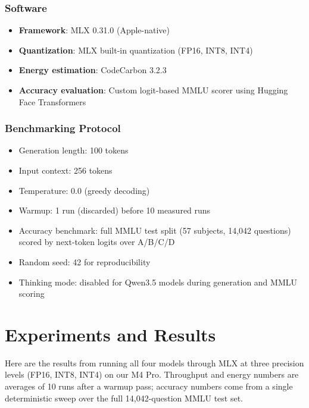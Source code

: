 \documentclass[journal]{IEEEtran}
\begin{document}
\subsubsection{Software}

\begin{itemize}[leftmargin=*,nosep]
    \item \textbf{Framework}: MLX 0.31.0 (Apple-native)
    \item \textbf{Quantization}: MLX built-in quantization (FP16, INT8, INT4)
    \item \textbf{Energy estimation}: CodeCarbon 3.2.3
    \item \textbf{Accuracy evaluation}: Custom logit-based MMLU scorer using Hugging Face Transformers
\end{itemize}

\subsubsection{Benchmarking Protocol}

\begin{itemize}[leftmargin=*,nosep]
    \item Generation length: 100 tokens
    \item Input context: 256 tokens
    \item Temperature: 0.0 (greedy decoding)
    \item Warmup: 1 run (discarded) before 10 measured runs
    \item Accuracy benchmark: full MMLU test split (57 subjects, 14,042 questions) scored by next-token logits over A/B/C/D
    \item Random seed: 42 for reproducibility
    \item Thinking mode: disabled for Qwen3.5 models during generation and MMLU scoring
\end{itemize}

\section{Experiments and Results}

Here are the results from running all four models through MLX at three precision levels (FP16, INT8, INT4) on our M4 Pro. Throughput and energy numbers are averages of 10 runs after a warmup pass; accuracy numbers come from a single deterministic sweep over the full 14,042-question MMLU test set.
\end{document}
